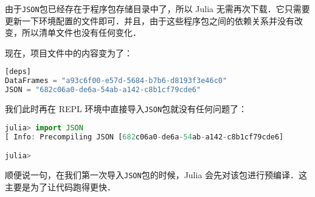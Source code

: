 由于\verb|JSON|包已经存在于程序包存储目录中了，所以 Julia 无需再次下载．它只需要更新一下环境配置的文件即可．并且，由于这些程序包之间的依赖关系并没有改变，所以清单文件也没有任何变化．

现在，项目文件中的内容变为了：

\begin{lstlisting}[language=julia]
[deps]
DataFrames = "a93c6f00-e57d-5684-b7b6-d8193f3e46c0"
JSON = "682c06a0-de6a-54ab-a142-c8b1cf79cde6"
\end{lstlisting}

我们此时再在 REPL 环境中直接导入\verb|JSON|包就没有任何问题了：

\begin{lstlisting}[language=julia]
julia> import JSON
[ Info: Precompiling JSON [682c06a0-de6a-54ab-a142-c8b1cf79cde6]

julia> 
\end{lstlisting}

顺便说一句，在我们第一次导入\verb|JSON|包的时候，Julia 会先对该包进行预编译．这主要是为了让代码跑得更快．